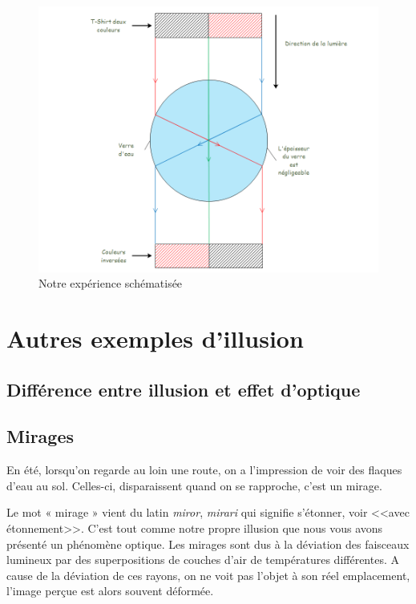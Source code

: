 \documentclass[a4paper, 12pt, onecolumn, openany]{report}
\begin{document}
	\begin{figure}[h]
	\begin{center}
	\includegraphics[scale=0.7]{refraction-experience.png}
	\end{center}
	\caption{Notre expérience schématisée}
	\label{Notre expérience schématisée}
	\end{figure}
	
\chapter{Autres exemples d'illusion}
	\section{Différence entre illusion et effet d'optique}
	\section{Mirages}
	En été, lorsqu’on regarde au loin une route, on a l’impression de voir des flaques d’eau au sol. Celles-ci, disparaissent quand on se rapproche, c’est un mirage. 
	
	Le mot « mirage » vient du latin \textit{miror}, \textit{mirari} qui signifie s’étonner, voir <<avec étonnement>>. C’est tout comme notre propre illusion que nous vous avons présenté un phénomène optique. Les mirages sont dus à la déviation des faisceaux lumineux par des superpositions de couches d’air de températures différentes.  
A cause de la déviation de ces rayons, on ne voit pas l’objet à son réel emplacement, l’image perçue est alors souvent déformée. 
	
\end{document}
